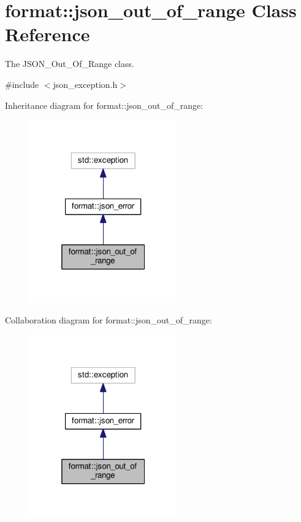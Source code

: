 \hypertarget{classformat_1_1json__out__of__range}{}\section{format\+:\+:json\+\_\+out\+\_\+of\+\_\+range Class Reference}
\label{classformat_1_1json__out__of__range}


The J\+S\+O\+N\+\_\+\+Out\+\_\+\+Of\+\_\+\+Range class.  




{\ttfamily \#include $<$json\+\_\+exception.\+h$>$}



Inheritance diagram for format\+:\+:json\+\_\+out\+\_\+of\+\_\+range\+:
\nopagebreak
\begin{figure}[H]
\begin{center}
\leavevmode
\includegraphics[width=181pt]{classformat_1_1json__out__of__range__inherit__graph}
\end{center}
\end{figure}


Collaboration diagram for format\+:\+:json\+\_\+out\+\_\+of\+\_\+range\+:
\nopagebreak
\begin{figure}[H]
\begin{center}
\leavevmode
\includegraphics[width=181pt]{classformat_1_1json__out__of__range__coll__graph}
\end{center}
\end{figure}
